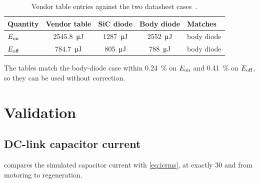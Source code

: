 \begin{table}[H]
\centering
\caption{Vendor table entries against the two datasheet
cases~\cite{wolfspeed_e3m0016,wolfspeed_plecs}.}
\label{tab:losstable-check}
\zebra
\begin{tabular}{lcccl}
\toprule
Quantity & Vendor table & SiC diode & Body diode & Matches \\
\midrule
$E_{\mathrm{on}}$  & \SI{2545.8}{\micro\joule} & \SI{1287}{\micro\joule} & \SI{2552}{\micro\joule} & body diode \\
$E_{\mathrm{off}}$ & \SI{784.7}{\micro\joule}  & \SI{805}{\micro\joule}  & \SI{788}{\micro\joule}  & body diode \\
\bottomrule
\end{tabular}
\end{table}

The tables match the body-diode case within \SI{0.24}{\percent} on $E_{\mathrm{on}}$
and \SI{0.41}{\percent} on $E_{\mathrm{off}}$, so they can be used without correction.

\section{Validation}
\label{sec:validation}

\subsection{DC-link capacitor current}

 compares the simulated capacitor current with
\cref{eq:icrms}, at exactly \SI{30}{\Arms} and from motoring to regeneration.

